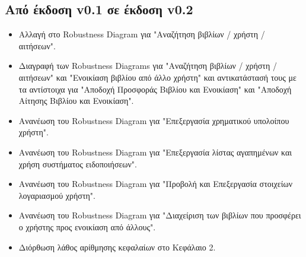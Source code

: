 \documentclass[12pt,a4paper]{article}
\begin{document}
\subsection{Από έκδοση v0.1 σε έκδοση v0.2}
\begin{itemize}
    \item Αλλαγή στο Robustness Diagram για "Αναζήτηση βιβλίων / χρήστη / αιτήσεων".
    \item Διαγραφή των Robustness Diagrams για "Αναζήτηση βιβλίων / χρήστη / αιτήσεων" και "Ενοικίαση βιβλίου από άλλο χρήστη" και αντικατάστασή τους με τα αντίστοιχα για "Αποδοχή Προσφοράς Βιβλίου και Ενοικίαση" και "Αποδοχή Αίτησης Βιβλίου και Ενοικίαση".
    \item Ανανέωση του Robustness Diagram για "Επεξεργασία χρηματικού υπολοίπου χρήστη".
    \item Ανανέωση του Robustness Diagram για "Επεξεργασία λίστας αγαπημένων και χρήση συστήματος ειδοποιήσεων".
    \item Ανανέωση του Robustness Diagram για "Προβολή και Επεξεργασία στοιχείων λογαριασμού χρήστη".
    \item Ανανέωση του Robustness Diagram για "Διαχείριση των βιβλίων που προσφέρει ο χρήστης
προς ενοικίαση από άλλους".
    \item Διόρθωση λάθος αρίθμησης κεφαλαίων στο Κεφάλαιο 2.
\end{itemize}
\end{document}

